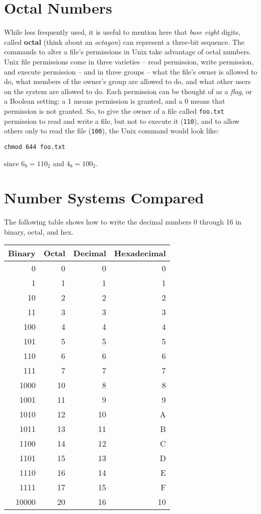 \setcounter{section}{7}
\section{Octal Numbers}

While less frequently used, it is useful to mention here that \textit{base eight} digits, called \textbf{octal} (think about an \textit{octagon}) can represent a three-bit sequence.  The commands to alter a file's permissions in Unix take advantage of octal numbers.  Unix file permissions come in three varieties -- read permission, write permission, and execute permission -- and in three groups -- what the file's owner is allowed to do, what members of the owner's group are allowed to do, and what other users on the system are allowed to do.  Each permission can be thought of as a \textit{flag}, or a Boolean setting: a 1 means permission is granted, and a 0 means that permission is not granted.  So, to give the owner of a file called \texttt{foo.txt} permission to read and write a file, but not to execute it (\texttt{110}), and to allow others only to read the file (\texttt{100}), the Unix command would look like:

\begin{center}\texttt{chmod 644 foo.txt}\end{center}

since $6_8 = 110_2$ and $4_8 = 100_2$.

\section*{Number Systems Compared}

The following table shows how to write the decimal numbers 0 through 16 in binary, octal, and hex.

\begin{center}
\begin{tabular}{rrrr}
\textbf{Binary} & \textbf{Octal} & \textbf{Decimal} & \textbf{Hexadecimal}\\
\hline
0 & 0 & 0 & 0\\
1 & 1 & 1 & 1\\
10 & 2 & 2 & 2\\
11 & 3 & 3 & 3\\
100 & 4 & 4 & 4\\
101 & 5 & 5 & 5\\
110 & 6 & 6 & 6\\
111 & 7 & 7 & 7\\
1000 & 10 & 8 & 8\\
1001 & 11 & 9 & 9\\
1010 & 12 & 10 & A\\
1011 & 13 & 11 & B\\
1100 & 14 & 12 & C\\
1101 & 15 & 13 & D\\
1110 & 16 & 14 & E\\
1111 & 17 & 15 & F\\
10000 & 20 & 16 & 10\\
\end{tabular}
\end{center}
